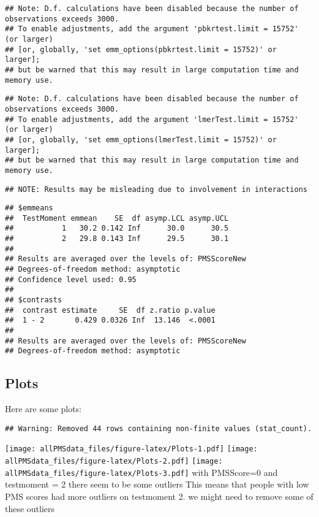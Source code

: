 \documentclass[
]{article}
\begin{document}
\begin{verbatim}
## Note: D.f. calculations have been disabled because the number of observations exceeds 3000.
## To enable adjustments, add the argument 'pbkrtest.limit = 15752' (or larger)
## [or, globally, 'set emm_options(pbkrtest.limit = 15752)' or larger];
## but be warned that this may result in large computation time and memory use.
\end{verbatim}

\begin{verbatim}
## Note: D.f. calculations have been disabled because the number of observations exceeds 3000.
## To enable adjustments, add the argument 'lmerTest.limit = 15752' (or larger)
## [or, globally, 'set emm_options(lmerTest.limit = 15752)' or larger];
## but be warned that this may result in large computation time and memory use.
\end{verbatim}

\begin{verbatim}
## NOTE: Results may be misleading due to involvement in interactions
\end{verbatim}

\begin{verbatim}
## $emmeans
##  TestMoment emmean    SE  df asymp.LCL asymp.UCL
##           1   30.2 0.142 Inf      30.0      30.5
##           2   29.8 0.143 Inf      29.5      30.1
## 
## Results are averaged over the levels of: PMSScoreNew 
## Degrees-of-freedom method: asymptotic 
## Confidence level used: 0.95 
## 
## $contrasts
##  contrast estimate     SE  df z.ratio p.value
##  1 - 2       0.429 0.0326 Inf  13.146  <.0001
## 
## Results are averaged over the levels of: PMSScoreNew 
## Degrees-of-freedom method: asymptotic
\end{verbatim}

\hypertarget{plots}{%
\subsection{Plots}\label{plots}}

Here are some plots:

\begin{verbatim}
## Warning: Removed 44 rows containing non-finite values (stat_count).
\end{verbatim}

\texttt{[image: allPMSdata\_files/figure-latex/Plots-1.pdf]}
\texttt{[image: allPMSdata\_files/figure-latex/Plots-2.pdf]}
\texttt{[image: allPMSdata\_files/figure-latex/Plots-3.pdf]} with
PMSScore=0 and testmoment = 2 there seem to be some outliers This means
that people with low PMS scores had more outliers on testmoment 2. we
might need to remove some of these outliers
\end{document}
